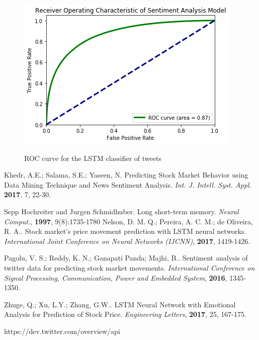 \documentclass[conference]{IEEEtran}
\begin{document}
\begin{minipage}{\linewidth}
\begin{figure}[H]
\centering
\caption{ROC curve for the LSTM classifier of tweets} 
\includegraphics[scale=0.4]{Graphs/ROCCurveSentiment.png}
\label{ROC Sentiment} 
\end{figure}
\end{minipage}


\begin{thebibliography}{2}
 Khedr, A.E.; Salama, S.E.; Yaseen, N. Predicting Stock Market Behavior using Data Mining Technique and News Sentiment Analysis. \textit{Int. J. Intell. Syst. Appl.} \textbf{2017}, 7, 22-30.

 Sepp Hochreiter and Jurgen Schmidhuber. Long short-term memory. \textit{Neural Comput.}, \textbf{1997}, 9(8):1735-1780
 Nelson, D. M. Q.; Pereira, A. C. M.; de Oliveira, R. A.. Stock market’s price movement
prediction with LSTM neural networks. \textit{International Joint Conference on Neural Networks (IJCNN)}, \textbf{2017}, 1419-1426.

 Pagolu, V. S.; Reddy, K. N.; Ganapati Panda; Majhi, B.. Sentiment
analysis of twitter data for predicting stock market
movements. \textit{International
Conference on Signal Processing, Communication,
Power and Embedded System}, \textbf{2016}, 1345-1350.

 Zhuge, Q.; Xu, L.Y.; Zhang, G.W..  LSTM Neural Network with Emotional
Analysis for Prediction of Stock Price. \textit{Engineering Letters}, \textbf{2017}, 25, 167-175.

 https://dev.twitter.com/overview/api
\end{thebibliography}
\end{document}
